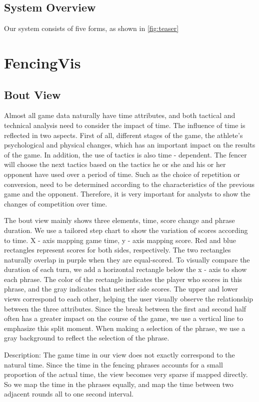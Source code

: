 \documentclass[journal]{vgtc}                %
\begin{document}
\subsection{System Overview}
Our system consists of five forms, as shown in \autoref{fig:teaser}
\section{FencingVis}
\subsection{Bout View}
Almost all game data naturally have time attributes, and both tactical and technical analysis need to consider the impact of time.
The influence of time is reflected in two aspects.
First of all, different stages of the game, the athlete's psychological and physical changes, which has an important impact on the results of the game.
In addition, the use of tactics is also time - dependent.
The fencer will choose the next tactics based on the tactics he or she and his or her opponent have used over a period of time.
Such as the choice of repetition or conversion, need to be determined according to the characteristics of the previous game and the opponent.
Therefore, it is very important for analysts to show the changes of competition over time.

The bout view mainly shows three elements, time, score change and phrase duration.
We use a tailored step chart to show the variation of scores according to time.
X - axis mapping game time, y - axis mapping score.
Red and blue rectangles represent scores for both sides, respectively.
The two rectangles naturally overlap in purple when they are equal-scored.
To visually compare the duration of each turn, we add a horizontal rectangle below the x - axis to show each phrase.
The color of the rectangle indicates the player who scores in this phrase, and the gray indicates that neither side scores.
The upper and lower views correspond to each other, helping the user visually observe the relationship between the three attributes.
Since the break between the first and second half often has a greater impact on the course of the game, we use a vertical line to emphasize this split moment.
When making a selection of the phrase, we use a gray background to reflect the selection of the phrase.

Description: The game time in our view does not exactly correspond to the natural time.
Since the time in the fencing phrases accounts for a small proportion of the actual time, the view becomes very sparse if mapped directly.
So we map the time in the phrases equally, and map the time between two adjacent rounds all to one second interval.
\end{document}
